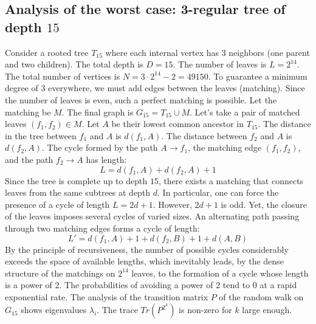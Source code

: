 \documentclass[12pt,a4paper]{article}
\begin{document}
\subsection{Analysis of the worst case: 3-regular tree of depth $15$}
Consider a rooted tree $T_{15}$ where each internal vertex has 3 neighbors (one parent and two children).
The total depth is $D = 15$.
The number of leaves is $L = 2^{14}$.
The total number of vertices is $N = 3 \cdot 2^{14} - 2 = 49150$.
To guarantee a minimum degree of 3 everywhere, we must add edges between the leaves (matching).
Since the number of leaves is even, such a perfect matching is possible.
Let the matching be $M$. The final graph is $G_{15} = T_{15} \cup M$.
Let's take a pair of matched leaves $(f_1, f_2) \in M$.
Let $A$ be their lowest common ancestor in $T_{15}$.
The distance in the tree between $f_1$ and $A$ is $d(f_1, A)$.
The distance between $f_2$ and $A$ is $d(f_2, A)$.
The cycle formed by the path $A \to f_1$, the matching edge $(f_1, f_2)$, and the path $f_2 \to A$ has length:
$$ L = d(f_1, A) + d(f_2, A) + 1 $$
Since the tree is complete up to depth $15$, there exists a matching that connects leaves from the same subtrees at depth $d$.
In particular, one can force the presence of a cycle of length $L = 2d + 1$. However, $2d+1$ is odd.
Yet, the closure of the leaves imposes several cycles of varied sizes. An alternating path passing through two matching edges forms a cycle of length:
$$ L' = d(f_1, A) + 1 + d(f_2, B) + 1 + d(A, B) $$
By the principle of recursiveness, the number of possible cycles considerably exceeds the space of available lengths, which inevitably leads, by the dense structure of the matchings on $2^{14}$ leaves, to the formation of a cycle whose length is a power of 2. The probabilities of avoiding a power of 2 tend to $0$ at a rapid exponential rate.
The analysis of the transition matrix $P$ of the random walk on $G_{15}$ shows eigenvalues $\lambda_i$. The trace $Tr(P^{2^k})$ is non-zero for $k$ large enough.
\end{document}
